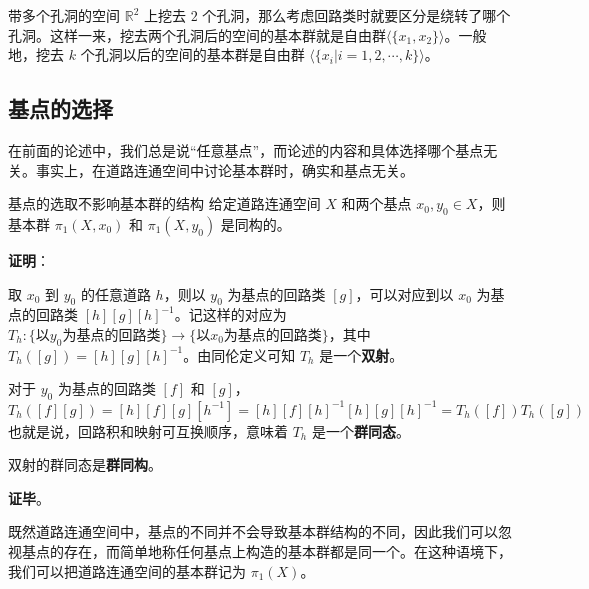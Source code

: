 \begin{example}{带多个孔洞的空间}
$\mathbb{R}^2$ 上挖去 $2$ 个孔洞，那么考虑回路类时就要区分是绕转了哪个孔洞。这样一来，挖去两个孔洞后的空间的基本群就是自由群$\langle\{x_1, x_2\}\rangle$。一般地，挖去 $k$ 个孔洞以后的空间的基本群是自由群 $\langle\{x_i|i=1, 2, \cdots, k\}\rangle$。
\end{example}

\subsection{基点的选择}

在前面的论述中，我们总是说“任意基点”，而论述的内容和具体选择哪个基点无关。事实上，在道路连通空间中讨论基本群时，确实和基点无关。

\begin{theorem}{基点的选取不影响基本群的结构}
给定道路连通空间 $X$ 和两个基点 $x_0, y_0\in X$，则基本群 $\pi_1(X, x_0)$ 和 $\pi_1(X, y_0)$ 是同构的。
\end{theorem}

\textbf{证明}：

取 $x_0$ 到 $y_0$ 的任意道路 $h$，则以 $y_0$ 为基点的回路类 $[g]$，可以对应到以 $x_0$ 为基点的回路类 $[h][g][h]^{-1}$。记这样的对应为 $T_h: \{\text{以} y_0 \text{为基点的回路类}\}\rightarrow\{\text{以} x_0 \text{为基点的回路类}\}$，其中 $T_h([g])=[h][g][h]^{-1}$。由同伦定义可知 $T_h$ 是一个\textbf{双射}。

对于 $y_0$ 为基点的回路类 $[f]$ 和 $[g]$，$$T_h([f][g])=[h][f][g][h^{-1}]=[h][f][h]^{-1}[h][g][h]^{-1}=T_h([f])T_h([g])$$
也就是说，回路积和映射可互换顺序，意味着 $T_h$ 是一个\textbf{群同态}。

双射的群同态是\textbf{群同构}。

\textbf{证毕}。

既然道路连通空间中，基点的不同并不会导致基本群结构的不同，因此我们可以忽视基点的存在，而简单地称任何基点上构造的基本群都是同一个。在这种语境下，我们可以把道路连通空间的基本群记为 $\pi_1(X)$。


